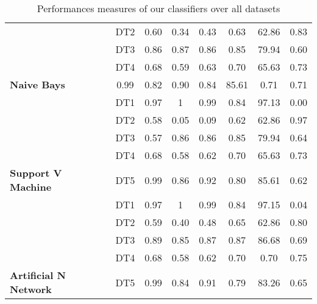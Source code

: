 \begin{table}
\begin{tabular}{|l|c|c|c|c|c|c|c|}
 \cline{2-8}
  &DT2 & 0.60 &0.34   &0.43&0.63&62.86&0.83 \\
  \cline{2-8}
  &DT3 &0.86 &0.87 &0.86&0.85&79.94&0.60\\
  \cline{2-8}
  &DT4 &0.68 &0.59&0.63&0.70&65.63&0.73\\
  \cline{2-8}
\multirow{-4}{*}{ \textbf{Naive Bays}}&0.99 &0.82&0.90&0.84&85.61&0.71&0.71\\
\hline
\cline{2-8}
&DT1 &0.97 &1   &0.99 &0.84 &97.13&0.00 \\
\cline{2-8}
  &DT2 &0.58  &0.05   & 0.09&0.62&62.86&0.97\\
  \cline{2-8}
  &DT3 &0.57 & 0.86&0.86&0.85&79.94&0.64\\
  \cline{2-8}
 & DT4 & 0.68&0.58&0.62&0.70&65.63&0.73\\
 \cline{2-8}
 \multirow{-4}{*}{ \textbf{Support V Machine}}& DT5 &0.99 &0.86&0.92&0.80&85.61&0.62\\
 \hline
\cline{2-8}
&DT1 &0.97&1 &0.99   &0.84 &97.15&0.04  \\
\cline{2-8}
&  DT2 &0.59  &0.40   &0.48&0.65&62.86&0.80 \\
\cline{2-8}
 & DT3 &0.89 &0.85 &0.87&0.87&86.68&0.69\\
 \cline{2-8}
 & DT4 &0.68 &0.58&0.62&0.70&0.70&0.75\\
  \cline{2-8}
  \multirow{-4}{*}{ \textbf{ Artificial N Network}}&DT5 &0.99 &0.84&0.91&0.79&83.26&0.65\\ 
  \hline
\end{tabular}
\caption{Performances measures of our classifiers over all datasets}
\end{table}